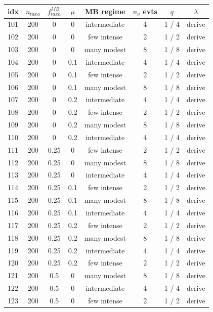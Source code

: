 \documentclass{article}
\begin{document}
\begin{table}
  \centering
  \begin{tabular}{ l | c | c | c | c   c   c | c }
    \hline
idx & $n_{taxa}$ & $f_{taxa}^{MB}$ & $\mu$ & MB regime & $n_{\nu}$ evts & $q$ & $\lambda$ \\
    \hline
    \hline
101 & 200 & 0 & 0 & intermediate & 4 & 1 / 4 & derive \\
102 & 200 & 0 & 0 & few intense & 2 & 1 / 2 & derive \\
103 & 200 & 0 & 0 & many modest  & 8 & 1 / 8 & derive \\
104 & 200 & 0 & 0.1 & intermediate & 4 & 1 / 4 & derive \\
105 & 200 & 0 & 0.1 & few intense & 2 & 1 / 2 & derive \\
106 & 200 & 0 & 0.1 & many modest  & 8 & 1 / 8 & derive \\
107 & 200 & 0 & 0.2 & intermediate & 4 & 1 / 4 & derive \\
108 & 200 & 0 & 0.2 & few intense & 2 & 1 / 2 & derive \\
109 & 200 & 0 & 0.2 & many modest  & 8 & 1 / 8 & derive \\
110 & 200 & 0 & 0.2 & intermediate & 4 & 1 / 4 & derive \\
111 & 200 & 0.25 & 0 & few intense & 2 & 1 / 2 & derive \\
112 & 200 & 0.25 & 0 & many modest  & 8 & 1 / 8 & derive \\
113 & 200 & 0.25 & 0 & intermediate & 4 & 1 / 4 & derive \\
114 & 200 & 0.25 & 0.1 & few intense & 2 & 1 / 2 & derive \\
115 & 200 & 0.25 & 0.1 & many modest  & 8 & 1 / 8 & derive \\
116 & 200 & 0.25 & 0.1 & intermediate & 4 & 1 / 4 & derive \\
117 & 200 & 0.25 & 0.2 & few intense & 2 & 1 / 2 & derive \\
118 & 200 & 0.25 & 0.2 & many modest  & 8 & 1 / 8 & derive \\
119 & 200 & 0.25 & 0.2 & intermediate & 4 & 1 / 4 & derive \\
120 & 200 & 0.25 & 0.2 & few intense & 2 & 1 / 2 & derive \\
121 & 200 & 0.5 & 0 & many modest  & 8 & 1 / 8 & derive \\
122 & 200 & 0.5 & 0 & intermediate & 4 & 1 / 4 & derive \\
123 & 200 & 0.5 & 0 & few intense & 2 & 1 / 2 & derive \\

\end{tabular}
\end{table}
\end{document}
